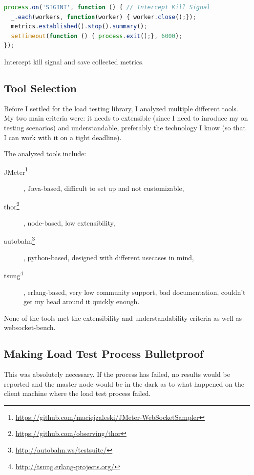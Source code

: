 \documentclass{uvamscse}
\begin{document}
\begin{sourcecode}[H]
\begin{lstlisting}[language=javascript]
process.on('SIGINT', function () { // Intercept Kill Signal
  _.each(workers, function(worker) { worker.close();});
  metrics.established().stop().summary();
  setTimeout(function () { process.exit();}, 6000);
});

\end{lstlisting}
\caption{Intercept kill signal and save collected metrics.}
\label{lstlisting:loadtestexec4}
\end{sourcecode}


\subsection{Tool Selection}

Before I settled for the load testing library, I analyzed multiple different tools. My two main criteria were: it needs to extensible (since I need to inroduce my on testing scenarios) and understandable, preferably the technology I know (so that I can work with it on a tight deadline).

The analyzed tools include:
\begin{description}
  \item [JMeter\footnote{\url{https://github.com/maciejzaleski/JMeter-WebSocketSampler}}], Java-based, difficult to set up and not customizable,
  \item [thor\footnote{\url{https://github.com/observing/thor}}], node-based, low extensibility,
  \item [autobahn\footnote{\url{http://autobahn.ws/testsuite/}}], python-based, designed with different usecases in mind,
  \item [tsung\footnote{\url{http://tsung.erlang-projects.org/}}], erlang-based, very low community support, bad documentation, couldn't get my head around it quickly enough.
\end{description}

None of the tools met the extensibility and understandability criteria as well as websocket-bench.

\subsection{Making Load Test Process Bulletproof}
This was absolutely necessary. If the process has failed, no results would be reported and the master node would be in the dark as to what happened on the client machine where the load test process failed.
\end{document}

